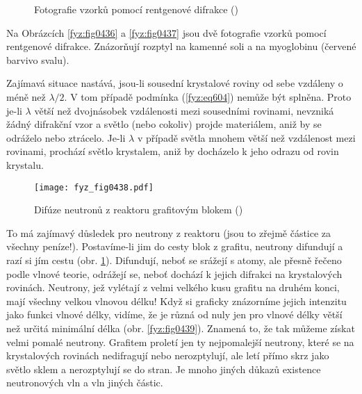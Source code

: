     \begin{figure}[ht!]
      \centering  
      \caption{Fotografie vzorků pomocí rentgenové difrakce (\cite[s.~515]{Feynman01})}
    \end{figure}

    Na Obrázcích \ref{fyz:fig0436} a \ref{fyz:fig0437} jsou dvě fotografie vzorků pomocí rentgenové
    difrakce. Znázorňují rozptyl na kamenné soli a na myoglobinu (červené barvivo svalu).  
    
    Zajímavá situace nastává, jsou-li sousední krystalové roviny od sebe vzdáleny o méně než
    \(λ/2\). V tom případě podmínka (\ref{fyz:eq604}) nemůže být splněna. Proto je-li \(\lambda\)
    větší než dvojnásobek vzdálenosti mezi sousedními rovinami, nevzniká žádný difrakční vzor a
    světlo (nebo cokoliv) projde materiálem, aniž by se odráželo nebo ztrácelo. Je-li \(\lambda\) v
    případě světla mnohem větší než vzdálenost mezi rovinami, prochází světlo krystalem, aniž by
    docházelo k jeho odrazu od rovin krystalu.  
    
    \begin{figure}[ht!] %
      \centering
      \texttt{[image: fyz\_fig0438.pdf]}
      \caption{Difúze neutronů z reaktoru grafitovým blokem (\cite[s.~515]{Feynman01})}
      \label{fyz:fig0438}
    \end{figure}

    To má zajímavý důsledek pro neutrony z reaktoru (jsou to zřejmě částice za všechny peníze!).
    Postavíme-li jim do cesty blok z grafitu, neutrony difundují a razí si jím cestu (obr.
    \ref{fyz:fig0438}). Difundují, neboť se srážejí s atomy, ale přesně řečeno podle vlnové teorie,
    odrážejí se, neboť dochází k jejich difrakci na krystalových rovinách. Neutrony, jež vylétají z
    velmi velkého kusu grafitu na druhém konci, mají všechny velkou vlnovou délku! Když si graficky
    znázorníme jejich intenzitu jako funkci vlnové délky, vidíme, že je různá od nuly jen pro vlnové
    délky větší než určitá minimální délka (obr. \ref{fyz:fig0439}). Znamená to, že tak můžeme získat
    velmi pomalé neutrony. Grafitem proletí jen ty nejpomalejší neutrony, které se na krystalových
    rovinách nedifragují nebo nerozptylují, ale letí přímo skrz jako světlo sklem a nerozptylují se
    do stran. Je mnoho jiných důkazů existence neutronových vln a vln jiných částic.

